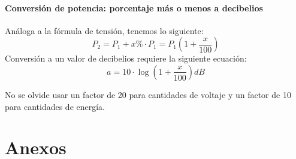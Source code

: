 \documentclass[
	11pt, %
	fleqn, %
	a4paper, %
]{LegrandOrangeBook}
\begin{document}
\subsection{Conversión de potencia: porcentaje más o menos a decibelios}
Análoga a la fórmula de tensión, tenemos lo siguiente:
\begin{equation}
P_2=P_1+x\%\cdot P_1= P_1\left(1+\frac{x}{100}\right)
\end{equation}
Conversión a un valor de decibelios requiere la siguiente ecuación:
\begin{equation}
a=10\cdot\log\left(1+\frac{x}{100}\right)dB
\end{equation}
\begin{remark}
No se olvide usar un factor de 20 para cantidades de voltaje y un factor de 10 para cantidades de energía.
\end{remark}
\part{Anexos}







\end{document}

